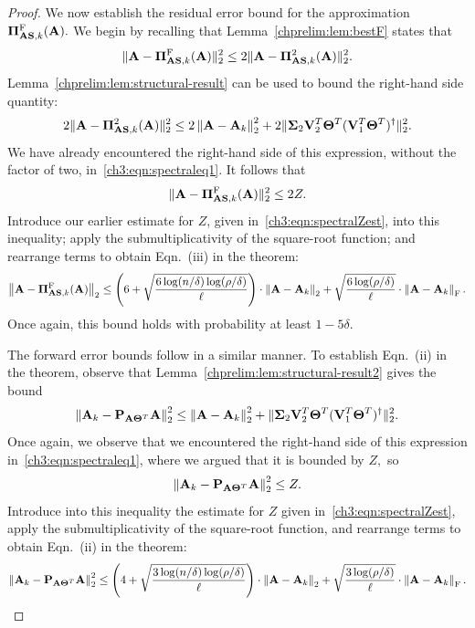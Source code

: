 \begin{proof}
We now establish the residual error bound for the approximation 
$\boldsymbol{\Pi}_{\mathbf{A}\mathbf{S}, k}^{\mathrm{F}}(\mathbf{A}).$ We begin by recalling that
Lemma~\ref{chprelim:lem:bestF} states that
\[
 \|\mathbf{A} - \boldsymbol{\Pi}_{\mathbf{A}\mathbf{S}, k}^{\mathrm{F}}(\mathbf{A})\|_2^2 \leq 2\| \mathbf{A} - \boldsymbol{\Pi}_{\mathbf{A}\mathbf{S}, k}^2(\mathbf{A}) \|_2^2.
\]
Lemma~\ref{chprelim:lem:structural-result} can be used to bound
the right-hand side quantity:
\[
 2\| \mathbf{A} - \boldsymbol{\Pi}_{\mathbf{A}\mathbf{S}, k}^{2}(\mathbf{A}) \|_2^2 \leq 2\left\|\mathbf{A} - \mathbf{A}_k\right\|_2^2 + 
             2\|\mathbf{\Sigma}_2\mathbf{V}_2^T\mathbf{\Theta}^T(\mathbf{V}_1^T\mathbf{\Theta}^T)^\dagger\|_2^2.
\]
We have already encountered the right-hand side of this expression, without
the factor of two, in~\eqref{ch3:eqn:spectraleq1}. It follows that 
\[
 \|\mathbf{A} - \boldsymbol{\Pi}_{\mathbf{A}\mathbf{S}, k}^{\mathrm{F}}(\mathbf{A})\|_2^2 \leq 2Z.
\]
Introduce our earlier estimate for $Z$, given in~\eqref{ch3:eqn:spectralZest},
into this inequality; apply the submultiplicativity of the square-root function; and rearrange
terms to obtain Eqn.~(iii) in the theorem:
\[
\left\|\mathbf{A} - \boldsymbol{\Pi}_{\mathbf{A}\mathbf{S}, k}^{\mathrm{F}}(\mathbf{A})\right\|_2 \leq \left(6 +
 \sqrt{\frac{6 \log(n/\delta)\log(\rho/\delta)}{\ell}} \right) \cdot 
   \left\|\mathbf{A} - \mathbf{A}_k\right\|_2 +
 \sqrt{\frac{6 \log(\rho/\delta)}{\ell}} \cdot \left\|\mathbf{A} - \mathbf{A}_k\right\|_\mathrm{F}.
\]
Once again, this bound holds with probability at least $1 - 5\delta.$

The forward error bounds follow in a similar manner. To establish Eqn.~(ii) in
the theorem, observe that Lemma~\ref{chprelim:lem:structural-result2} gives
the bound
\[
 \left\|\mathbf{A}_k - \mathbf{P}_{\mathbf{A}\mathbf{\Theta}^T} \mathbf{A} \right\|_2^2 \leq \left\|\mathbf{A} - \mathbf{A}_k\right\|_2^2 + 
             \|\mathbf{\Sigma}_2\mathbf{V}_2^T\mathbf{\Theta}^T(\mathbf{V}_1^T\mathbf{\Theta}^T)^\dagger\|_2^2.
\]
Once again, we observe that we encountered the right-hand side of this expression
in~\eqref{ch3:eqn:spectraleq1}, where we argued that it is bounded by $Z,$ so
\[
 \left\|\mathbf{A}_k - \mathbf{P}_{\mathbf{A}\mathbf{\Theta}^T} \mathbf{A} \right\|_2^2 \leq Z.
\]
Introduce into this inequality the estimate for $Z$ given in~\eqref{ch3:eqn:spectralZest},
apply the submultiplicativity of the square-root function, and rearrange
terms to obtain Eqn.~(ii) in the theorem:
\[
 \left\|\mathbf{A}_k - \mathbf{P}_{\mathbf{A}\mathbf{\Theta}^T} \mathbf{A} \right\|_2^2 \leq \left(4 +
 \sqrt{\frac{3 \log(n/\delta)\log(\rho/\delta)}{\ell}} \right) \cdot 
   \left\|\mathbf{A} - \mathbf{A}_k\right\|_2 +
 \sqrt{\frac{3 \log(\rho/\delta)}{\ell}} \cdot \left\|\mathbf{A} - \mathbf{A}_k\right\|_\mathrm{F}.
\]


\end{proof}

